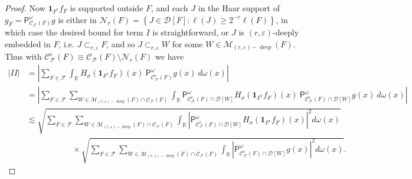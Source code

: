 \documentclass[10pt,a4paper]{amsart}
\begin{document}
\begin{proof}
Now $\mathbf{1}_{F^{c}}f_{F}$ is supported outside $F$, and each $J$ in the
Haar support of $g_{F}=\mathsf{P}_{\mathcal{C}_{\mathcal{F}}\left(  F\right)
}^{\omega}g$ is either in $\mathcal{N}_{r}\left(  F\right)  =\left\{
J\in\mathcal{D}\left[  F\right]  :\ell\left(  J\right)  \geq2^{-r}\ell\left(
F\right)  \right\}  $, in which case the desired bound for term $I$ is
straightforward, or $J$ is $\left(  r,\varepsilon\right)  $-deeply embedded in
$F$, i.e. $J\subset_{r,\varepsilon}F$, and so $J\subset_{r,\varepsilon}W$ for
some $W\in\mathcal{M}_{\left(  r,\varepsilon\right)  -\operatorname*{deep}%
}\left(  F\right)  $. Thus with $\mathcal{C}_{\mathcal{F}}^{\flat}\left(
F\right)  \equiv\mathcal{C}_{\mathcal{F}}\left(  F\right)  \setminus
\mathcal{N}_{r}\left(  F\right)  $ we have%
\begin{align*}
\left\vert II\right\vert  & =\left\vert \sum_{F\in\mathcal{F}}\int
_{\mathbb{R}}H_{\sigma}\left(  \mathbf{1}_{F^{c}}f_{F}\right)  \left(
x\right)  \ \mathsf{P}_{\mathcal{C}_{\mathcal{F}}^{\flat}\left(  F\right)
}^{\omega}g\left(  x\right)  \ d\omega\left(  x\right)  \right\vert \\
& =\left\vert \sum_{F\in\mathcal{F}}\sum_{W\in\mathcal{M}_{\left(
r,\varepsilon\right)  -\operatorname*{deep}}\left(  F\right)  \cap
\mathcal{C}_{\mathcal{F}}\left(  F\right)  }\int_{\mathbb{R}}\mathsf{P}%
_{\mathcal{C}_{\mathcal{F}}^{\flat}\left(  F\right)  \cap\mathcal{D}\left[
W\right]  }^{\omega}H_{\sigma}\left(  \mathbf{1}_{F^{c}}f_{F}\right)  \left(
x\right)  \ \mathsf{P}_{\mathcal{C}_{\mathcal{F}}^{\flat}\left(  F\right)
\cap\mathcal{D}\left[  W\right]  }^{\omega}g\left(  x\right)  \ d\omega\left(
x\right)  \right\vert \\
& \lesssim\sqrt{\sum_{F\in\mathcal{F}}\sum_{W\in\mathcal{M}_{\left(
r,\varepsilon\right)  -\operatorname*{deep}}\left(  F\right)  \cap
\mathcal{C}_{\mathcal{F}}\left(  F\right)  }\int_{\mathbb{R}}\left\vert
\mathsf{P}_{\mathcal{C}_{\mathcal{F}}^{\flat}\left(  F\right)  \cap
\mathcal{D}\left[  W\right]  }^{\omega}H_{\sigma}\left(  \mathbf{1}_{F^{c}%
}f_{F}\right)  \left(  x\right)  \right\vert ^{2}d\omega\left(  x\right)  }\\
& \ \ \ \ \ \ \ \ \ \ \ \ \ \ \ \ \ \ \ \ \ \ \ \ \ \times\sqrt{\sum
_{F\in\mathcal{F}}\sum_{W\in\mathcal{M}_{\left(  r,\varepsilon\right)
-\operatorname*{deep}}\left(  F\right)  \cap\mathcal{C}_{\mathcal{F}}\left(
F\right)  }\int_{\mathbb{R}}\left\vert \mathsf{P}_{\mathcal{C}_{\mathcal{F}%
}^{\flat}\left(  F\right)  \cap\mathcal{D}\left[  W\right]  }^{\omega}g\left(
x\right)  \right\vert ^{2}d\omega\left(  x\right)  }.

\end{align*}
\end{proof}
\end{document}
